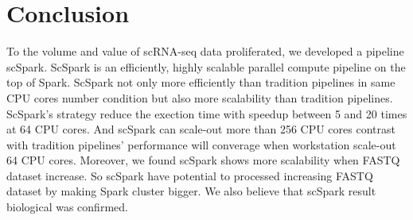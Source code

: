 \documentclass[conference]{IEEEtran}
\begin{document}
\section{Conclusion}

To the volume and value of scRNA-seq data proliferated, we developed a pipeline scSpark.
ScSpark is an efficiently, highly scalable parallel compute pipeline on the top of Spark.
ScSpark not only more efficiently than tradition pipelines in same CPU cores number condition but also more scalability than tradition pipelines.
ScSpark's strategy reduce the exection time with speedup between 5 and 20 times at 64 CPU cores.
And scSpark can scale-out more than 256 CPU cores contrast with tradition pipelines' performance will converage when workstation scale-out 64 CPU cores.
Moreover, we found scSpark shows more scalability when FASTQ dataset increase.
So scSpark have potential to processed increasing FASTQ dataset by making Spark cluster bigger.
We also believe that scSpark result biological was confirmed. 



\end{document}
